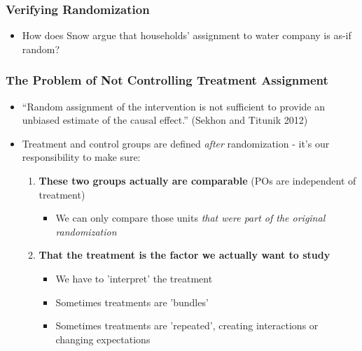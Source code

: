 \documentclass[xcolor=x11names,compress]{beamer}\usepackage[]{graphicx}\usepackage[]{color}
\renewcommand{\(}{\begin{columns}}
\renewcommand{\)}{\end{columns}}
\newcommand{\<}[1]{\begin{column}{#1}}
\renewcommand{\>}{\end{column}}
\begin{document}
\begin{frame}
\frametitle{Verifying Randomization}
\begin{itemize}
\item How does Snow argue that households' assignment to water company is as-if random?
\end{itemize}
\end{frame}


\begin{frame}
\frametitle{The Problem of Not Controlling Treatment Assignment}
\begin{itemize}
\item ``Random assignment of the intervention is not sufficient to provide an unbiased estimate of the causal effect.'' (Sekhon and Titunik 2012)
\pause
\item Treatment and control groups are defined \textit{after} randomization - it's our responsibility to make sure:
\pause
\begin{enumerate}
\item \textbf{These two groups actually are comparable} (POs are independent of treatment)
\pause
\begin{itemize}
\item We can only compare those units \textit{that were part of the original randomization}
\end{itemize}
\pause
\item \textbf{That the treatment is the factor we actually want to study}
\pause
\begin{itemize}
\item We have to 'interpret' the treatment
\pause
\item Sometimes treatments are 'bundles'
\pause
\item Sometimes treatments are 'repeated', creating interactions or changing expectations
\end{itemize}
\end{enumerate}
\end{itemize}
\end{frame}
\end{document}
